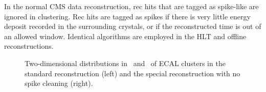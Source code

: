 In the normal CMS data reconstruction, rec hits that are tagged as spike-like are ignored in clustering. 
Rec hits are tagged as spikes if there is very little energy deposit recorded in the surrounding crystals, or if the reconstructed time is out of an allowed window.
Identical algorithms are employed in the HLT and offline reconstructions.

\begin{figure}[htbp]
  \centering
  \caption{
    Two-dimensional distributions in \sipip\ and \sieie\ of ECAL clusters in the standard reconstruction (left) and the special reconstruction with no spike cleaning (right).
  }
  \label{fig:showershape_map}
\end{figure}

